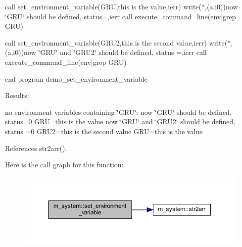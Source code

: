 call set\+\_\+environment\+\_\+variable(\textquotesingle{}G\+RU\textquotesingle{},\textquotesingle{}this is the value\textquotesingle{},ierr) write($\ast$,\textquotesingle{}(a,i0)\textquotesingle{})\textquotesingle{}now \char`\"{}\+G\+R\+U\char`\"{} should be defined, status=\textquotesingle{},ierr call execute\+\_\+command\+\_\+line(\textquotesingle{}env$\vert$grep G\+RU\textquotesingle{})

call set\+\_\+environment\+\_\+variable(\textquotesingle{}G\+R\+U2\textquotesingle{},\textquotesingle{}this is the second value\textquotesingle{},ierr) write($\ast$,\textquotesingle{}(a,i0)\textquotesingle{})\textquotesingle{}now \char`\"{}\+G\+R\+U\char`\"{} and \char`\"{}\+G\+R\+U2\char`\"{} should be defined, status =\textquotesingle{},ierr call execute\+\_\+command\+\_\+line(\textquotesingle{}env$\vert$grep G\+RU\textquotesingle{})

end program demo\+\_\+set\+\_\+environment\+\_\+variable

Results\+:

no environment variables containing \char`\"{}\+G\+R\+U\char`\"{}\+: now \char`\"{}\+G\+R\+U\char`\"{} should be defined, status=0 G\+RU=this is the value now \char`\"{}\+G\+R\+U\char`\"{} and \char`\"{}\+G\+R\+U2\char`\"{} should be defined, status =0 G\+R\+U2=this is the second value G\+RU=this is the value 

References str2arr().

Here is the call graph for this function\+:
\nopagebreak
\begin{figure}[H]
\begin{center}
\leavevmode
\includegraphics[width=350pt]{namespacem__system_ad813765403a5d9d6fb7a2edcb669fe4b_cgraph}
\end{center}
\end{figure}
\mbox{\label{namespacem__system_af7e778ffc24aa7bc00b842a8e673aeaa}} 
